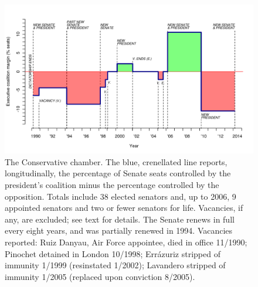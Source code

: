 \documentclass[letter,12pt]{article}
\begin{document}
\begin{figure}
\begin{center}
    \includegraphics[width=\columnwidth]{../graphs/senChile.pdf}
  \caption{The Conservative chamber. The blue, crenellated line reports, longitudinally, the percentage of Senate seats controlled by the president's coalition minus the percentage controlled by the opposition. Totals include 38 elected senators and, up to 2006, 9 appointed senators and two or fewer senators for life. Vacancies, if any, are excluded; see text for details. The Senate renews in full every eight years, and was partially renewed in 1994. Vacancies reported: Ruiz Danyau, Air Force appointee, died in office 11/1990; Pinochet detained in London 10/1998; Errázuriz stripped of immunity 1/1999 (resinstated 1/2002); Lavandero stripped of immunity 1/2005 (replaced upon conviction 8/2005). }\label{f:senChile}
\end{center}
\end{figure}
\end{document}
